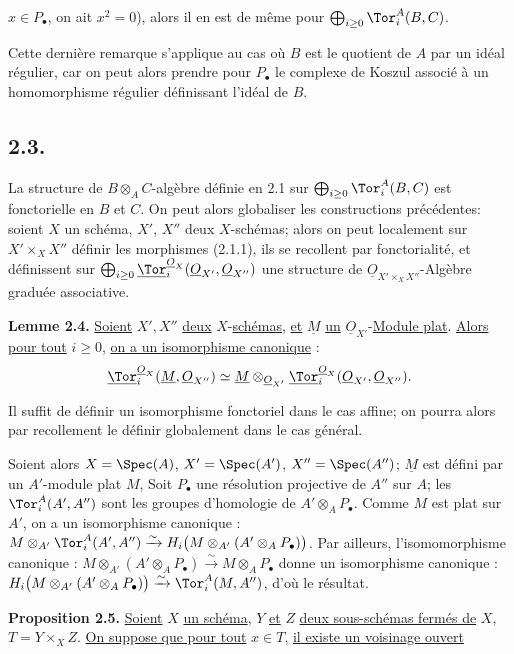 
\(x\in P_\bullet\), on ait \(x^2=0\)), alors il en est de même pour \(\bigoplus_{i\ge0}\Tor_i^A(B,C)\).

Cette dernière remarque s'applique au cas où \(B\) est le quotient de \(A\) par un idéal régulier, car on peut alors prendre pour \(P_\bullet\) le complexe de Koszul associé à un homomorphisme régulier définissant l'idéal de \(B\).

\subsection*{2.3.}
La structure de \(B\otimes_A C\)-algèbre définie en 2.1 sur \(\bigoplus_{i\ge0}\Tor_i^A(B,C)\) est fonctorielle en \(B\) et \(C\). On peut alors globaliser les constructions précédentes: soient \(X\) un schéma, \(X'\), \(X''\) deux \(X\)-schémas; alors on peut localement sur \(X'\times_X X''\) définir les morphismes (2.1.1), ils se recollent par fonctorialité, et définissent sur \(\bigoplus_{i\ge0}\underline{\Tor}_i^{\underline{O}_X}(\underline{O}_{X'},\underline{O}_{X''})\) une structure de \(\underline{O}_{X'\times_X X''}\)-Algèbre graduée associative.

\textbf{Lemme 2.4.} \uline{Soient} \(X',X''\) \uline{deux} \(X\)-\uline{schémas}, \uline{et} \(\underline{M}\) \uline{un} \(\underline{O}_{X'}\)-\uline{Module plat}. \uline{Alors pour tout} \(i\ge0\), \uline{on a un isomorphisme canonique} :
\begin{equation}\notag
\underline{\Tor}_i^{\underline{O}_X}(\underline{M},\underline{O}_{X''})\simeq
\underline{M}\otimes_{\underline{O}_{X'}}\underline{\Tor}_i^{\underline{O}_X}(\underline{O}_{X'},\underline{O}_{X''}).
\end{equation}

Il suffit de définir un isomorphisme fonctoriel dans le cas affine; on pourra alors par recollement le définir globalement dans le cas général.

Soient alors \(X=\Spec(A)\), \(X'=\Spec(A')\), \(X''=\Spec(A'')\); \(\underline{M}\) est défini par un \(A'\)-module plat \(M\), Soit \(P_\bullet\) une résolution projective de \(A''\) sur \(A\); les \(\Tor_i^A(A',A'')\) sont les groupes d'homologie de \(A'\otimes_A P_\bullet\). Comme \(M\) est plat sur \(A'\), on a un isomorphisme canonique : \(M\otimes_{A'}\Tor_i^A(A',A'')\xrightarrow{\sim}H_i\bigl(M\otimes_{A'}(A'\otimes_A P_\bullet)\bigr)\). Par ailleurs, l'isomomorphisme canonique : \(M\otimes_{A'}(A'\otimes_A P_\bullet)\xrightarrow{\sim}M\otimes_A P_\bullet\) donne un isomorphisme canonique : \(H_i\bigl(M\otimes_{A'}(A'\otimes_A P_\bullet)\bigr)\xrightarrow{\sim}\Tor_i^A(M,A'')\), d'où le résultat.

\textbf{Proposition 2.5.} \uline{Soient} \(X\) \uline{un schéma}, \(Y\) \uline{et} \(Z\) \uline{deux sous-schémas fermés de} \(X\), \(T=Y\times_X Z\). \uline{On suppose que pour tout} \(x\in T\), \uline{il existe un voisinage ouvert}
